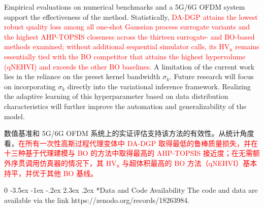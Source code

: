 \documentclass[11pt]{article}
\makeatletter
\newcommand{\blind}{0}
\renewcommand\section{\@startsection {section}{1}{\z@}%
                                       {-3.5ex \@plus -1ex \@minus -.2ex}%
                                       {2.3ex \@plus.2ex}%
                                       {\normalfont\fontfamily{phv}\fontsize{16}{19}\bfseries}}
\makeatother
\begin{document}
Empirical evaluations on numerical benchmarks and a 5G/6G OFDM system support the effectiveness of the method. Statistically, \textcolor{red}{DA-DGP attains the lowest robust quality loss among all one-shot Gaussian process surrogate variants and the highest AHP-TOPSIS closeness across the thirteen surrogate- and BO-based methods examined; without additional sequential simulator calls, its $\mathrm{HV}_{\mathrm{n}}$ remains essentially tied with the BO competitor that attains the highest hypervolume (qNEHVI) and exceeds the other BO baselines.}%
A limitation of the current work lies in the reliance on the preset kernel bandwidth $\sigma_{k}$. Future research will focus on incorporating $\sigma_{k}$ directly into the variational inference framework. Realizing the adaptive learning of this hyperparameter based on data distribution characteristics will further improve the automation and generalizability of the model.

数值基准和 5G/6G OFDM 系统上的实证评估支持该方法的有效性。从统计角度看，\textcolor{red}{在所有一次性高斯过程代理变体中 DA-DGP 取得最低的鲁棒质量损失，并在十三种基于代理建模与 BO 的方法中取得最高的 AHP-TOPSIS 接近度；在无需额外序贯调用仿真器的情况下，其 $\mathrm{HV}_{\mathrm{n}}$ 与超体积最高的 BO 方法（qNEHVI）基本持平，并优于其他 BO 基线。}%




\blind
\begingroup
\section*{Data and Code Availability}
The code and data are available via the link https://zenodo.org/records/18263984.
\endgroup
\fi


%




	
\end{document}
